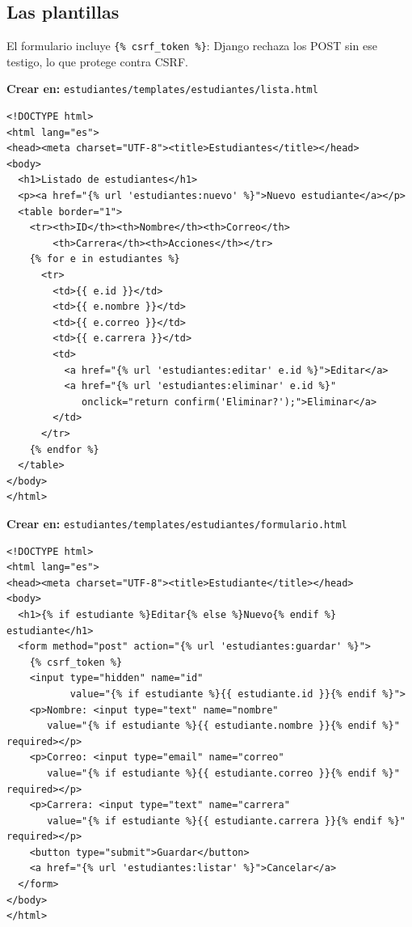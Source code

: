 \subsection{Las plantillas}
\label{ap:crud:django:templates}

El formulario incluye \texttt{\{\% csrf\_token \%\}}: Django rechaza los
POST sin ese testigo, lo que protege contra CSRF.

{\small\textbf{Crear en:} \texttt{estudiantes/templates/estudiantes/lista.html}}
\begin{lstlisting}[style=html,caption={lista.html (plantilla de listado)},label={lst:dj-lista}]
<!DOCTYPE html>
<html lang="es">
<head><meta charset="UTF-8"><title>Estudiantes</title></head>
<body>
  <h1>Listado de estudiantes</h1>
  <p><a href="{% url 'estudiantes:nuevo' %}">Nuevo estudiante</a></p>
  <table border="1">
    <tr><th>ID</th><th>Nombre</th><th>Correo</th>
        <th>Carrera</th><th>Acciones</th></tr>
    {% for e in estudiantes %}
      <tr>
        <td>{{ e.id }}</td>
        <td>{{ e.nombre }}</td>
        <td>{{ e.correo }}</td>
        <td>{{ e.carrera }}</td>
        <td>
          <a href="{% url 'estudiantes:editar' e.id %}">Editar</a>
          <a href="{% url 'estudiantes:eliminar' e.id %}"
             onclick="return confirm('Eliminar?');">Eliminar</a>
        </td>
      </tr>
    {% endfor %}
  </table>
</body>
</html>
\end{lstlisting}

{\small\textbf{Crear en:} \texttt{estudiantes/templates/estudiantes/formulario.html}}
\begin{lstlisting}[style=html,caption={formulario.html (alta y edicion)},label={lst:dj-form}]
<!DOCTYPE html>
<html lang="es">
<head><meta charset="UTF-8"><title>Estudiante</title></head>
<body>
  <h1>{% if estudiante %}Editar{% else %}Nuevo{% endif %} estudiante</h1>
  <form method="post" action="{% url 'estudiantes:guardar' %}">
    {% csrf_token %}
    <input type="hidden" name="id"
           value="{% if estudiante %}{{ estudiante.id }}{% endif %}">
    <p>Nombre: <input type="text" name="nombre"
       value="{% if estudiante %}{{ estudiante.nombre }}{% endif %}" required></p>
    <p>Correo: <input type="email" name="correo"
       value="{% if estudiante %}{{ estudiante.correo }}{% endif %}" required></p>
    <p>Carrera: <input type="text" name="carrera"
       value="{% if estudiante %}{{ estudiante.carrera }}{% endif %}" required></p>
    <button type="submit">Guardar</button>
    <a href="{% url 'estudiantes:listar' %}">Cancelar</a>
  </form>
</body>
</html>
\end{lstlisting}

